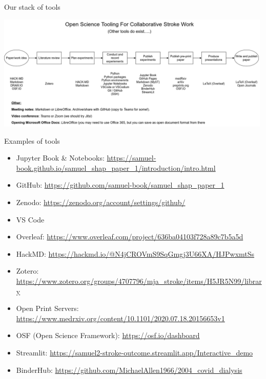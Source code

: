 \documentclass[xcolor={usenames,dvipsnames}]{beamer}
\begin{document}

\begin{frame}{Our stack of tools}


\begin{center}
\includegraphics[width=0.99\textwidth]{./images/open_science_light}
\end{center}

\end{frame}


\begin{frame}{Examples of tools}

\footnotesize

\begin{itemize}
    \item Jupyter Book \& Notebooks: 
    \url{https://samuel-book.github.io/samuel_shap_paper_1/introduction/intro.html}
    \item GitHub: 
    \url{https://github.com/samuel-book/samuel_shap_paper_1}
    \item Zenodo: 
    \url{https://zenodo.org/account/settings/github/}
    \item VS Code
    \item Overleaf:
    \url{https://www.overleaf.com/project/636ba04103f728a89c7b5a5d}
    \item HackMD: 
    \url{https://hackmd.io/@N4jCROVmS9SqGmgj3U66XA/HJPwxmtSs}
    \item Zotero: 
    \url{https://www.zotero.org/groups/4707796/mja_stroke/items/H5JR5N99/library}
    \item Open Print Servers:
    \url{https://www.medrxiv.org/content/10.1101/2020.07.18.20156653v1}
    \item OSF (Open Science Framework):
    \url{https://osf.io/dashboard}
    \item Streamlit: 
    \url{https://samuel2-stroke-outcome.streamlit.app/Interactive_demo}
    \item BinderHub: 
    \url{https://github.com/MichaelAllen1966/2004_covid_dialysis}
    
    
\end{itemize}


\end{frame}
\end{document}
